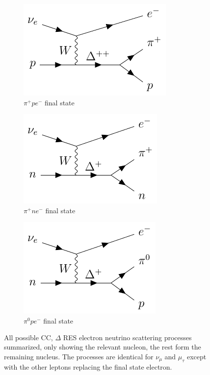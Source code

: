 \documentclass[a4paper,12pt]{article}
\begin{document}
\begin{figure}[H]
    \centering
    \begin{subfigure}[b]{0.3\textwidth}
        \centering
        \includegraphics{figures/fds/RESneu1.pdf}
        \caption{
            $\pi^+pe^-$ final state
        }
    \end{subfigure}
    \begin{subfigure}[b]{0.3\textwidth}
        \centering
        \includegraphics{figures/fds/RESneu2.pdf}
        \caption{
            $\pi^+ne^-$ final state
        }
    \end{subfigure}
    \begin{subfigure}[b]{0.3\textwidth}
        \centering
        \includegraphics{figures/fds/RESneu3.pdf}
        \caption{
            $\pi^0pe^-$ final state
        }
    \end{subfigure}
    \caption{
        All possible CC, $\Delta$ RES electron neutrino scattering processes summarized, only showing the relevant nucleon, the rest form the remaining nucleus.
        The processes are identical for $\nu_\mu$ and $\mu_\tau$ except with the other leptons replacing the final state electron.
    }\label{fig:RES_fd}
\end{figure}
\end{document}

